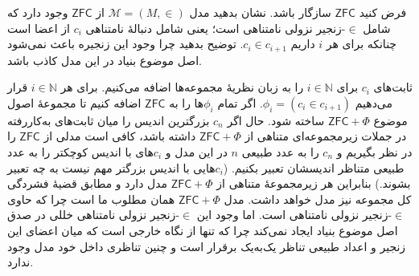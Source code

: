 فرض کنید
$\mathsf{ZFC}$
سازگار باشد.
نشان بدهید مدل
$\mathcal{M}=(M,\in)$
از
$\mathsf{ZFC}$
وجود دارد که شامل
$\in$-زنجیر
نزولی نامتناهی است؛ یعنی شامل دنبالهٔ نامتناهی
$c_i$
از اعضا است چنانکه برای هر
$i$
داریم
$c_i\in c_{i+1}$.
توضیح بدهید چرا وجود این زنجیره باعث نمی‌شود اصل موضوع بنیاد در این مدل کاذب باشد.
\begin{ans}
    ثابت‌های
    $c_i$
    برای
    $i\in\mathbb{N}$
    را به زبان نظریهٔ مجموعه‌ها اضافه می‌کنیم.
    برای هر
    $i\in\mathbb{N}$
    قرار می‌دهیم
    $\phi_i=(c_i\in c_{i+1})$.
    اگر تمام
    $\phi_i$ها
    را به
    $\mathsf{ZFC}$
    اضافه کنیم تا مجموعهٔ اصول موضوع
    $\mathsf{ZFC}+\Phi$
    ساخته شود. حال اگر
    $c_n$
    بزرگترین اندیس را میان ثابت‌های به‌کاررفته در جملات زیرمجموعه‌ای متناهی از
    $\mathsf{ZFC}+\Phi$
    داشته باشد، کافی است مدلی از
    $\mathsf{ZFC}$
    را در نظر بگیریم و
    $c_n$
    را به عدد طبیعی
    $n$
    در این مدل و
    $c_i$های با اندیس کوچکتر را به عدد طبیعی متناظر اندیسشان تعبیر بکنیم.
    ($c_i$هایی با اندیس بزرگتر مهم نیست به چه تعبیر بشوند.)
    بنابراین هر زیرمجموعهٔ متناهی از
    $\mathsf{ZFC}+\Phi$
    مدل دارد و مطابق قضیهٔ فشردگی کل مجموعه نیز مدل خواهد داشت. مدل
    $\mathsf{ZFC}+\Phi$
    همان مطلوب ما است چرا که حاوی
    $\in$-زنجیر نزولی نامتناهی است.
    اما وجود این
    $\in$-زنجیر نزولی نامتناهی خللی در صدق
    اصل موضوع بنیاد ایجاد نمی‌کند چرا که تنها از نگاه خارجی است که میان اعضای این زنجیر و اعداد طبیعی تناظر یک‌به‌یک برقرار است و چنین تناظری داخل خود مدل وجود ندارد.
\end{ans}